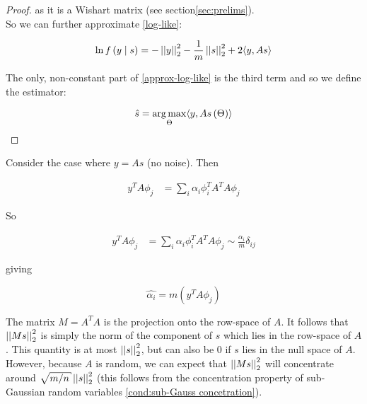 \begin{proof}
as it is a Wishart matrix (see section\ref{sec:prelims}). 
\\
So we can further approximate \eqref{log-like}:

\begin{equation}
\ln{f\left(y \mid s\right)}  = - \left|\left|y\right|\right|_2^2 - \frac{1}{m}\left|\left|s\right|\right|_2^2 + 2\langle y, As \rangle
\label{approx-log-like}
\end{equation}

The only, non-constant part of \eqref{approx-log-like} is the third term and so we define the estimator:

\begin{equation}
\hat{s} = \operatorname*{arg\,max}_{\Theta} \langle y , As\left(\Theta\right)\rangle
\label{eq: compressive-estimator}
\end{equation}
\end{proof}

\begin{corollary}
Consider the case where \( y = As\) (no noise). Then

\begin{align*}
y^TA\phi_j &= \sum_i \alpha_i \phi_i^TA^TA\phi_j
\end{align*}



So 


\begin{align*}
y^TA\phi_j &= \sum_i \alpha_i \phi_i^TA^TA\phi_j \sim \frac{\alpha_i}{m} \delta_{ij}
\end{align*}

giving
 
\begin{equation}
\widehat{\alpha_i} = m\left(y^TA\phi_j\right)
\end{equation}
\end{corollary}

\begin{remark}
The matrix \(M = A^TA\) is the projection onto the row-space of \(A\). It follows that \(\left|\left|Ms\right|\right|_2^2\) is simply the norm of the component of \(s\) which lies in the row-space of \(A\). This quantity is at most \(\left|\left|s\right|\right|_2^2\), but can also be \(0\) if \(s\) lies in the null space of \(A\). However, because \(A\) is random, we can expect that \(\left|\left|Ms\right|\right|_2^2\) will concentrate around \(\sqrt{m/n}\vectornorm{s}_2^2\) (this follows from the concentration property of sub-Gaussian random variables \eqref{cond:sub-Gauss concetration}).
\end{remark}

